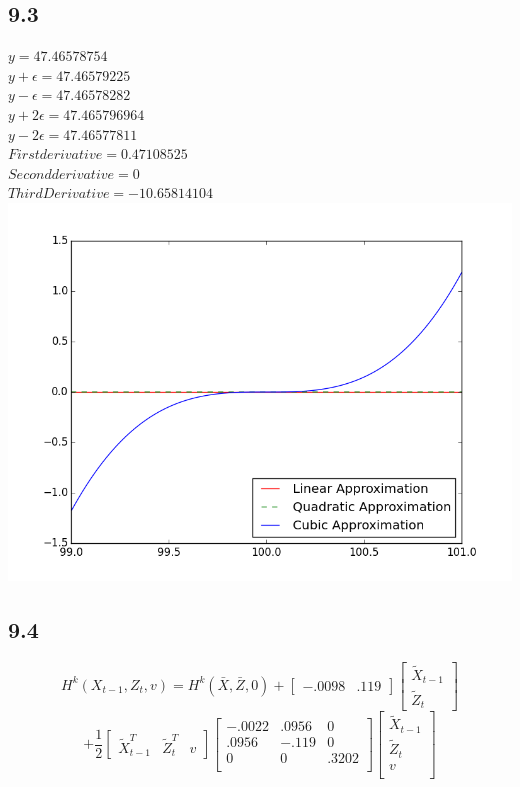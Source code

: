 \documentclass[letterpaper,12pt]{article}
\theoremstyle{definition}
\begin{document}
\subsection*{9.3}

$y =  47.46578754$\\
$y + \epsilon =  47.46579225$\\
$y - \epsilon = 47.46578282$\\
$y + 2\epsilon = 47.465796964$\\
$y - 2\epsilon = 47.46577811$\\
$First derivative = 0.47108525$\\
$Second derivative = 0$\\
$Third Derivative =  -10.65814104$\\

\includegraphics[scale = .75]{lqc}

\subsection*{9.4}

\[H^k(X_{t-1},Z_t,v)=H^k(\bar{X},\bar{Z},0)+\begin{bmatrix} -.0098 & .119 \end{bmatrix} \begin{bmatrix} \tilde{X}_{t-1} \\ \tilde{Z}_t \end{bmatrix}\]
\[+\frac{1}{2}\begin{bmatrix} \tilde{X}_{t-1}^T & \tilde{Z}_t^T & v \end{bmatrix} 
\begin{bmatrix}
 -.0022 & .0956 & 0 \\
 .0956 &  -.119 & 0 \\
 0 & 0 & .3202\\
\end{bmatrix}
\begin{bmatrix}
\tilde{X}_{t-1} \\
\tilde{Z}_t \\
v \\
\end{bmatrix}
\]
\end{document}
